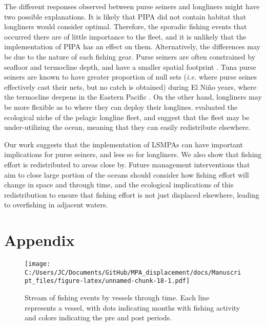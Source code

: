 \documentclass[11pt,]{article}
\begin{document}
The different responses observed between purse seiners and longliners
might have two possible explanations. It is likely that PIPA did not
contain habitat that longliners would consider optimal. Therefore, the
sporadic fishing events that occurred there are of little importance to
the fleet, and it is unlikely that the implementation of PIPA has an
effect on them. Alternatively, the differences may be due to the nature
of each fishing gear. Purse seiners are often constrained by seafloor
and termocline depth, and have a smaller spatial footprint
\citep{kroodsma_2018}. Tuna purse seiners are known to have greater
proportion of null sets (\emph{i.e.} where purse seines effectively cast
their nets, but no catch is obtained) during El Niño years, where the
termocline deepens in the Eastern Pacific \citep{dreyfusleon_2015}. On
the other hand, longliners may be more flexible as to where they can
deploy their longlines. \citet{ortuocrespo_2018} evaluated the
ecological niche of the pelagic longline fleet, and suggest that the
fleet may be under-utilizing the ocean, meaning that they can easily
redistribute elsewhere.

Our work suggests that the implementation of LSMPAs can have important
implications for purse seiners, and less so for longliners. We also show
that fishing effort is redistributed to areas close by. Future
management interventions that aim to close large portion of the oceans
should consider how fishing effort will change in space and through
time, and the ecological implications of this redistribution to ensure
that fishing effort is not just displaced elsewhere, leading to
overfishing in adjacent waters.

\clearpage

\hypertarget{appendix}{%
\section{Appendix}\label{appendix}}

\setcounter{table}{0}  \renewcommand{\thetable}{S\arabic{table}} \setcounter{figure}{0} \renewcommand{\thefigure}{S\arabic{figure}}

\begin{figure}
\centering
\texttt{[image: C:/Users/JC/Documents/GitHub/MPA\_displacement/docs/Manuscript\_files/figure-latex/unnamed-chunk-18-1.pdf]}
\caption{\label{fig:unnamed-chunk-18}\label{fig:baci_strict}Stream of
fishing events by vessels through time. Each line represents a vessel,
with dots indicating months with fishing activity and colors indicating
the pre and post periods.}
\end{figure}
\end{document}
